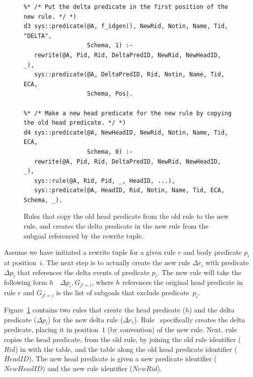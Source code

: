 \begin{figure}[!t]
\ssp
\centering
\begin{lstlisting}
%* /* Put the delta predicate in the first position of the new rule. */ *)
d3 sys::predicate(@A, f_idgen(), NewRid, Notin, Name, Tid, "DELTA", 
                  Schema, 1) :-
   rewrite(@A, Pid, Rid, DeltaPredID, NewRid, NewHeadID, _),
   sys::predicate(@A, DeltaPredID, Rid, Notin, Name, Tid, ECA, 
                  Schema, Pos).

%* /* Make a new head predicate for the new rule by copying the old head predicate. */ *)
d4 sys::predicate(@A, NewHeadID, NewRid, Notin, Name, Tid, ECA, 
                  Schema, 0) :-
   rewrite(@A, Pid, Rid, DeltaPredID, NewRid, NewHeadID, _),
   sys::rule(@A, Rid, Pid, _, HeadID, ...),
   sys::predicate(@A, HeadID, Rid, Notin, Name, Tid, ECA, Schema, _).
\end{lstlisting}
\caption{\label{ch:evita:fig:delta2}Rules that copy the old head predicate from the old rule
to the new rule, and creates the delta predicate in the new rule from the subgoal referenced
by the rewrite tuple.}
\end{figure}

Assume we have initiated a rewrite tuple for a given rule $r$ and body
predicate $p_i$ at position~$i$.  The next step is to actually create the new
rule $\Delta r_i$ with predicate $\Delta p_i$ that references the delta events of
predicate $p_i$.  The new rule will take the following form $h$~\ol{:-}~$\Delta
p_i, G_{j!=i}$, where $h$ references the original head predicate in rule $r$
and $G_{j!=i}$ is the list of subgoals that exclude predicate~$p_i$.

Figure~\ref{ch:evita:fig:delta2} contains two rules that create the head
predicate ($h$) and the delta predicate ($\Delta p_i$) for the new delta rule
($\Delta r_i$).  Rule~ specifically creates the delta predicate, placing
it in position~$1$ (by convention) of the new rule.  Next, rule~ copies
the head predicate, from the old rule, by joining the old rule identifier
($Rid$) in  with the  table, and the  table
along the old head predicate identifier ($HeadID$).  The new head predicate is
given a new predicate identifier ($NewHeadID$) and the new rule identifier
($NewRid$).


